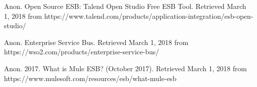 \documentclass[a4paper]{article}
\begin{document}
\begin{thebibliography}{9}
Anon. Open Source ESB: Talend Open Studio Free ESB Tool. Retrieved March 1, 2018 from https://www.talend.com/products/application-integration/esb-open-studio/ 

Anon. Enterprise Service Bus. Retrieved March 1, 2018 from https://wso2.com/products/enterprise-service-bus/

Anon. 2017. What is Mule ESB? (October 2017). Retrieved March 1, 2018 from https://www.mulesoft.com/resources/esb/what-mule-esb


\end{thebibliography}

\bigskip

\clearpage\clearpage\pagestyle{plain}
\thispagestyle{FirstPage}


\bigskip
\end{document}
